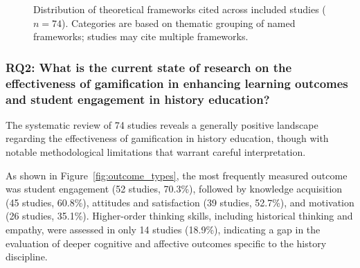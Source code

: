 \documentclass[a4paper,fleqn]{cas-sc}
\begin{document}
\begin{figure}[ht!]
\centering
{}
\caption{Distribution of theoretical frameworks cited across included studies ($n=74$). Categories are based on thematic grouping of named frameworks; studies may cite multiple frameworks.}
\label{fig:theoretical_frameworks}
\end{figure}

\subsubsection{RQ2: What is the current state of research on the effectiveness of gamification in enhancing learning outcomes and student engagement in history education?}


The systematic review of 74 studies reveals a generally positive landscape regarding the effectiveness of gamification in history education, though with notable methodological limitations that warrant careful interpretation.

As shown in Figure~\ref{fig:outcome_types}, the most frequently measured outcome was student engagement (52 studies, 70.3\%), followed by knowledge acquisition (45 studies, 60.8\%), attitudes and satisfaction (39 studies, 52.7\%), and motivation (26 studies, 35.1\%). Higher-order thinking skills, including historical thinking and empathy, were assessed in only 14 studies (18.9\%), indicating a gap in the evaluation of deeper cognitive and affective outcomes specific to the history discipline.
\end{document}
